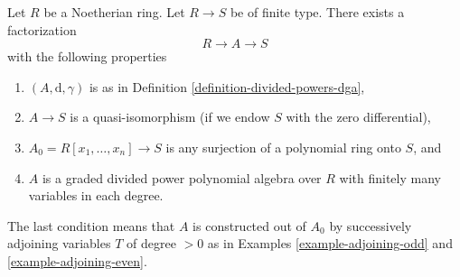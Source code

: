\begin{lemma}
\label{lemma-tate-resolution}
Let $R$ be a Noetherian ring. Let $R \to S$ be of finite type.
There exists a factorization
$$
R \to A \to S
$$
with the following properties
\begin{enumerate}
\item $(A, \text{d}, \gamma)$ is as in
Definition \ref{definition-divided-powers-dga},
\item $A \to S$ is a quasi-isomorphism (if we endow $S$ with
the zero differential),
\item $A_0 = R[x_1, \ldots, x_n] \to S$ is any surjection of a polynomial
ring onto $S$, and
\item $A$ is a graded divided power polynomial algebra over $R$
with finitely many variables in each degree.
\end{enumerate}
The last condition means that $A$ is constructed out of $A_0$ by
successively adjoining variables $T$ of degree $> 0$ as in
Examples \ref{example-adjoining-odd} and \ref{example-adjoining-even}.
\end{lemma}


